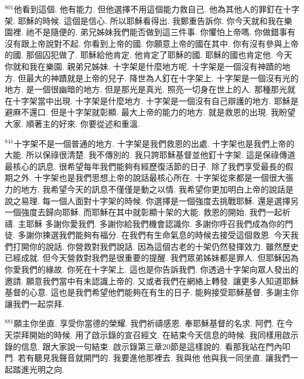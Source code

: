 \documentclass{book}
\begin{document}
$^{801}$他看到這個.
他有能力.
但他選擇不用這個能力救自己.
他為其他人的罪釘在十字架.
耶穌的時候.
這個是信心.
所以耶穌看得出.
我鄭重告訴你.
你今天就和我在樂園裡.
祂不是隨便的.
弟兄姊妹我們能否做到這三件事.
你懼怕上帝嗎.
你做錯事有沒有跟上帝說對不起.
你看到上帝的國.
你願意上帝的國在其中.
你有沒有參與上帝的國.
那個囚犯做了.
耶穌給他肯定.
他肯定了耶穌的國.
耶穌的國也肯定他.
今天你就和我在樂園.
親弟兄姊妹.
十字架是什麼地方呢.
十字架是一個沒有神蹟的地方.
但最大的神蹟就是上帝的兒子.
降世為人釘在十字架上.
十字架是一個沒有光的地方.
是一個很幽暗的地方.
但是那光是真光.
照亮一切身在世上的人.
那種那光就在十字架當中出現.
十字架是什麼地方.
十字架是一個沒有自己辯護的地方.
耶穌是避麻不還口.
但是十字架就彰顯.
最大上帝的能力的地方.
就是救恩的出現.
我盼望大家.
順著主的好來.
你要從述和重溫.

$^{841}$十字架不是一個普通的地方.
十字架是我們救恩的出處.
十字架也是我們上帝的大能.
所以保祿很清楚.
我不傳別的.
我只誇耶穌基督並他釘十字架.
這是保祿傳道最核心的訊息.
很希望每年我們能夠有經歷復活節的日子.
除了我們享受最長的假期之外.
十字架也是我們思想上帝的說話最核心所在.
十字架從來都是一個很大張力的地方.
我希望今天的訊息不僅僅是動之以情.
我希望你更加明白上帝的說話是說之易理.
每一個人面對十字架的時候.
你選擇是一個強度去挑戰耶穌.
還是選擇另一個強度去歸向耶穌.
而耶穌在其中就彰顯十架的大能.
救恩的開始.
我們一起祈禱.
主耶穌 多謝你愛我們.
多謝你給我們機會認識你.
多謝你呼召我們成為你的門徒.
多謝你揀選我們能夠有福分.
在我們有生命氣息的時候去接受這個救恩.
今天我們打開你的說話.
你營救對我們說話.
因為這個古老的十架仍然發揮效力.
雖然歷史已經成就.
但今天營救對我們是很重要的提醒.
我們眾弟姊妹都是罪人.
但耶穌因為你愛我們的緣故.
你死在十字架上.
這也是你告訴我們.
你透過十字架向眾人發出的邀請.
願意我們當中有未認識上帝的.
又或者我們在網絡上轉發.
讓更多人知道耶穌基督的心意.
這也是我們希望他們能夠在有生的日子.
能夠接受耶穌基督.
多謝主你讓我們一起崇拜.

$^{881}$願主你坐直.
享受你當德的榮耀.
我們祈禱感恩.
奉耶穌基督的名求.
阿們.
在今天崇拜開始的時候.
用了啟示錄的宣召經文.
在結束今天信息的時候.
我同樣用啟示錄的信息.
跟大家說一句結束.
啟示錄第三章20節是這樣說的.
看那我站在門內叩門.
若有聽見我聲音就開門的.
我要進他那裡去.
我與他 他與我一同坐直.
讓我們一起踏進光明之向.
\newpage
\end{document}
